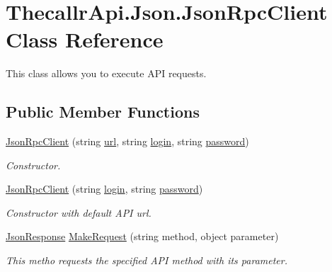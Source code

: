 \hypertarget{class_thecallr_api_1_1_json_1_1_json_rpc_client}{\section{Thecallr\+Api.\+Json.\+Json\+Rpc\+Client Class Reference}
\label{class_thecallr_api_1_1_json_1_1_json_rpc_client}
}


This class allows you to execute A\+P\+I requests.  


\subsection*{Public Member Functions}
\begin{DoxyCompactItemize}
\item 
\hyperlink{class_thecallr_api_1_1_json_1_1_json_rpc_client_a643b5479b710d4ba06d41a153aa24e1c}{Json\+Rpc\+Client} (string \hyperlink{class_thecallr_api_1_1_json_1_1_json_rpc_client_af0e422ceb48e0e60ea2931a60f5b3e29}{url}, string \hyperlink{class_thecallr_api_1_1_json_1_1_json_rpc_client_a5abb517979932f03537abbff5007e4fa}{login}, string \hyperlink{class_thecallr_api_1_1_json_1_1_json_rpc_client_aefa7c23e20a776ca0862d47dffab33ce}{password})
\begin{DoxyCompactList}\small\item\em Constructor. \end{DoxyCompactList}\item 
\hyperlink{class_thecallr_api_1_1_json_1_1_json_rpc_client_a9e96579260649ba1a845989cc9033822}{Json\+Rpc\+Client} (string \hyperlink{class_thecallr_api_1_1_json_1_1_json_rpc_client_a5abb517979932f03537abbff5007e4fa}{login}, string \hyperlink{class_thecallr_api_1_1_json_1_1_json_rpc_client_aefa7c23e20a776ca0862d47dffab33ce}{password})
\begin{DoxyCompactList}\small\item\em Constructor with default A\+P\+I url. \end{DoxyCompactList}\item 
\hyperlink{class_thecallr_api_1_1_json_1_1_json_response}{Json\+Response} \hyperlink{class_thecallr_api_1_1_json_1_1_json_rpc_client_a9e7b2b6af7bc036bc92c9d742fe7a223}{Make\+Request} (string method, object parameter)
\begin{DoxyCompactList}\small\item\em This metho requests the specified A\+P\+I method with its parameter. \end{DoxyCompactList}\end{DoxyCompactItemize}
